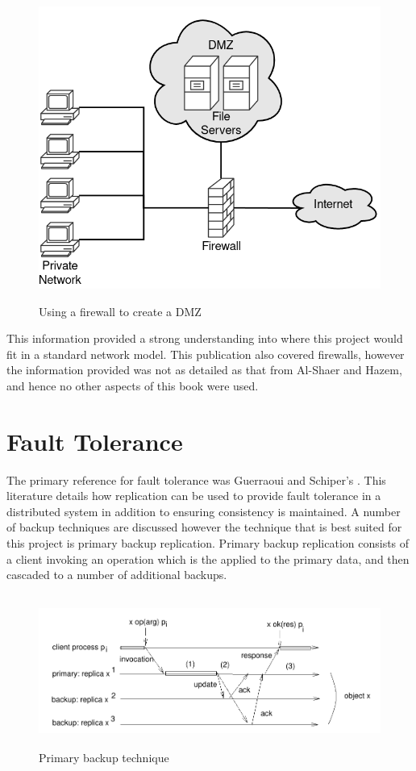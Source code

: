 \documentclass[a4paper, 11pt]{report}
\begin{document}
\begin{figure}[H]
\centering
\includegraphics[height=10cm,keepaspectratio]{DMZ}
\caption{Using a firewall to create a \acrshort{DMZ}}
\label{fig:dmz}
\end{figure}

This information provided a strong understanding into where this project would fit in a standard network model. This publication also covered firewalls, however the information provided was not as detailed as that from Al-Shaer and Hazem, and hence no other aspects of this book were used.

\section{Fault Tolerance}
The primary reference for fault tolerance was Guerraoui and Schiper's \cite{faulttol}. This literature details how replication can be used to provide fault tolerance in a distributed system in addition to ensuring consistency is maintained.  A number of backup techniques are discussed however the technique that is best suited for this project is primary backup replication. Primary backup replication consists of a client invoking an operation which is the applied to the primary data, and then cascaded to a number of additional backups.

\begin{figure}[H]
\centering
\includegraphics[height=5cm,keepaspectratio]{primback}
\caption{Primary backup technique \cite{faulttol}} 
\label{fig:backup}
\end{figure}
\end{document}
